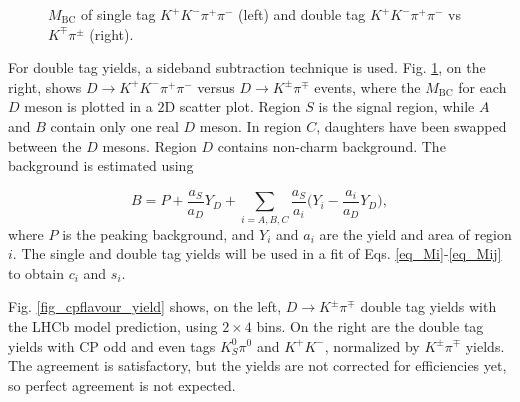 \documentclass[12pt, a4paper, notitlepage, onecolumn]{article}
\begin{document}
\begin{figure}[H]
\begin{subfigure}{0.5\textwidth}
  \end{subfigure}
  \caption{$M_\text{BC}$ of single tag $K^+K^-\pi^+\pi^-$ (left) and double tag $K^+K^-\pi^+\pi^-$ vs $K^\mp\pi^\pm$ (right).}
  \label{fig_stdtyields}
\end{figure}

For double tag yields, a sideband subtraction technique is used. Fig. \ref{fig_stdtyields}, on the right, shows $D\to K^+K^-\pi^+\pi^-$ versus $D\to K^\pm\pi^\mp$ events, where the $M_\text{BC}$ for each $D$ meson is plotted in a $2$D scatter plot. Region $S$ is the signal region, while $A$ and $B$ contain only one real $D$ meson. In region $C$, daughters have been swapped between the $D$ mesons. Region $D$ contains non-charm background. The background is estimated using

\begin{equation*}
  B = P + \frac{a_S}{a_D}Y_D + \sum_{i = A, B, C}\frac{a_S}{a_i}\Big(Y_i - \frac{a_i}{a_D}Y_D\Big),
\end{equation*}
where $P$ is the peaking background, and $Y_i$ and $a_i$ are the yield and area of region $i$. The single and double tag yields will be used in a fit of Eqs. \eqref{eq_Mi}-\eqref{eq_Mij} to obtain $c_i$ and $s_i$.

Fig. \ref{fig_cpflavour_yield} shows, on the left, $D\to K^\pm\pi^\mp$ double tag yields with the LHCb model prediction, using $2\times 4$ bins. On the right are the double tag yields with CP odd and even tags $K_S^0\pi^0$ and $K^+K^-$, normalized by $K^\pm\pi^\mp$ yields. The agreement is satisfactory, but the yields are not corrected for efficiencies yet, so perfect agreement is not expected.
\end{document}
